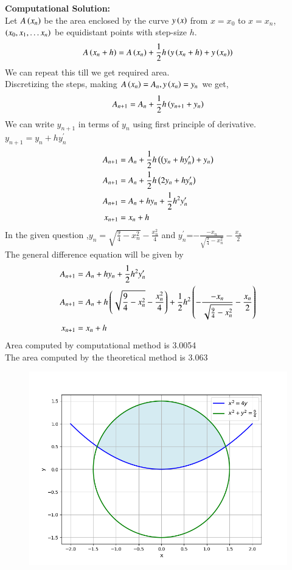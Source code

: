 \documentclass[journal]{IEEEtran}
\numberwithin{equation}{enumi}
\numberwithin{figure}{enumi}
\begin{document}
\textbf{Computational Solution:}\\
Let $A\left(x_n\right)$ be the area enclosed by the curve $y\left(x\right)$ from $x=x_0$ to $x=x_n$, $\left(x_0, x_1, \dots x_n\right)$ be equidistant points with step-size $h$.
\begin{align}
  A\left(x_n+h\right)=A\left(x_n\right)+\frac{1}{2}h\left(y\left(x_n+h\right)+y\left(x_n\right)\right)
\end{align}
We can repeat this till we get required area.\\
Discretizing the steps, making $A\left(x_n\right)=A_n, y\left(x_n\right)=y_n$ we get,
\begin{align}
 A_{n+1}=A_n+\frac{1}{2}h\left(y_{n+1}+y_n\right)
\end{align}
We can write $y_{n+1}$ in terms of $y_n$ using first principle of derivative. $y_{n+1}=y_n+hy^{\prime}_n$
\begin{align}
  A_{n+1}&=A_n+\frac{1}{2}h\left(\left(y_{n}+hy^{\prime}_n\right)+y_n\right)\\
  A_{n+1}&=A_n+\frac{1}{2}h\left(2y_n+hy^{\prime}_n\right)\\
  A_{n+1}&=A_n+hy_n+\frac{1}{2}h^2y^{\prime}_n\\
  x_{n+1}&=x_n+h
\end{align}
In the given question ,$y_n=\sqrt{\frac{9}{4}-x_n^2}-\frac{x_n^2}{4}$ and $y_n^{\prime}$=$-\frac{-x_n}{\sqrt{\frac{9}{4}-x_n^2}}-\frac{x_n}{2}$\\
The general difference equation will be given by
\begin{align}
  A_{n+1}&=A_n+hy_n+\frac{1}{2}h^2y^{\prime}_n\\
  A_{n+1}&=A_n+h\left(\sqrt{\frac{9}{4}-x_n^2}-\frac{x_n^2}{4}\right)+\frac{1}{2}h^2\left(-\frac{-x_n}{\sqrt{\frac{9}{4}-x_n^2}}-\frac{x_n}{2}\right)\\
   x_{n+1}&=x_n+h
\end{align}
Area computed by computational method is 3.0054\\
The area computed by the theoretical method is 3.063\\
\begin{figure}[h!]
	\centering
	\includegraphics[width=\columnwidth]{figs/Figure_1.png}
	\label{stemplot}
\end{figure}
\end{document}
